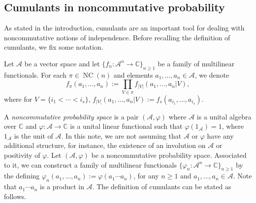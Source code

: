\documentclass[11pt]{article}
\numberwithin{equation}{section}
\numberwithin{equation}{section}
\newcommand{\A}{\mathcal{A}}
\newcommand{\NC}{\operatorname{NC}}
\begin{document}
\subsection{Cumulants in noncommutative probability}\label{sec:cumulants}

As stated in the introduction, cumulants are an important tool for dealing with noncommutative notions of independence. Before recalling the definition of cumulants, we fix some notation.
\begin{Definition}
 Let $\A$ be a vector space and let $\{f_n\colon \A^n \to \mathbb{C}\}_{n\geq1}$ be a family of multilinear functionals. For each $\pi \in \NC(n)$ and elements $a_1,\dots,a_n \in \A$, we denote{\samepage
\[
	f_{\pi}(a_1,\dots,a_n) := \prod_{V \in \pi} f_{|V|}(a_1,\dots,a_n | V),
\]
where for $V = \{i_1 < \cdots < i_s\}$, $f_{|V|}(a_1,\dots,a_n|V) := f_s(a_{i_1},\dots,a_{i_s})$.}
\end{Definition}
A \textit{noncommutative probability space} is a pair $(\A,\varphi)$ where $\A$ is a unital algebra over $\mathbb{C}$ and $\varphi\colon \A\to \mathbb{C}$ is a unital linear functional such that $\varphi(1_\A)=1$, where $1_\A$ is the unit of $\A$. In this note, we are not assuming that $\A$ or $\varphi$ have any additional structure, for instance, the existence of an involution on $\A$ or positivity of $\varphi$.
Let $(\A,\varphi)$ be a noncommutative probability space. Associated to it, we can construct a family of multilinear functionals $\{\varphi_n\colon \A^n\to\mathbb{C}\}_{n\geq 1}$ by the defining $\varphi_n(a_1,\dots,a_n) := \varphi(a_1\cdots a_n)$, for any $n\geq1$ and $a_1,\dots,a_n\in \A$. Note that $a_1\cdots a_n$ is a product in $\A$. The definition of cumulants can be stated as follows.
\end{document}
